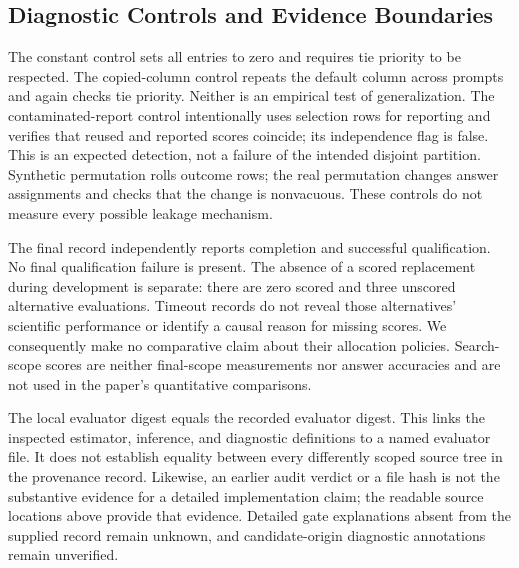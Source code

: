 \documentclass{article}
\begin{document}
\subsection{Diagnostic Controls and Evidence Boundaries}
The constant control sets all entries to zero and requires tie priority to be respected. The copied-column control repeats the default column across prompts and again checks tie priority. Neither is an empirical test of generalization. The contaminated-report control intentionally uses selection rows for reporting and verifies that reused and reported scores coincide; its independence flag is false. This is an expected detection, not a failure of the intended disjoint partition. Synthetic permutation rolls outcome rows; the real permutation changes answer assignments and checks that the change is nonvacuous. These controls do not measure every possible leakage mechanism.

The final record independently reports completion and successful qualification. No final qualification failure is present. The absence of a scored replacement during development is separate: there are zero scored and three unscored alternative evaluations. Timeout records do not reveal those alternatives' scientific performance or identify a causal reason for missing scores. We consequently make no comparative claim about their allocation policies. Search-scope scores are neither final-scope measurements nor answer accuracies and are not used in the paper's quantitative comparisons.

The local evaluator digest equals the recorded evaluator digest. This links the inspected estimator, inference, and diagnostic definitions to a named evaluator file. It does not establish equality between every differently scoped source tree in the provenance record. Likewise, an earlier audit verdict or a file hash is not the substantive evidence for a detailed implementation claim; the readable source locations above provide that evidence. Detailed gate explanations absent from the supplied record remain unknown, and candidate-origin diagnostic annotations remain unverified.
\end{document}
